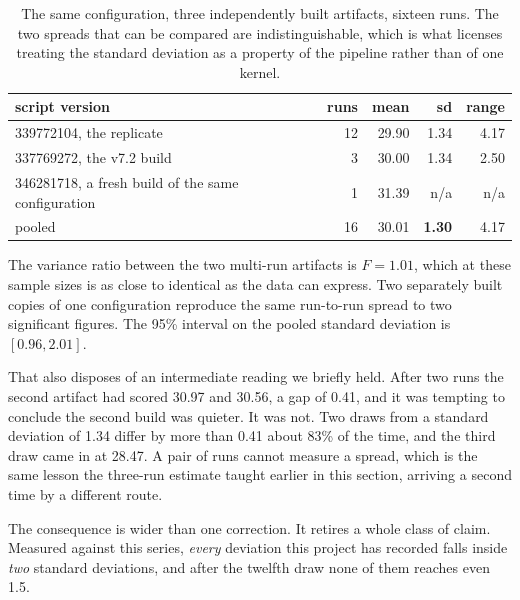 \documentclass[11pt]{article}
\begin{document}
\begin{table}[H]
\centering
\caption{The same configuration, three independently built artifacts, sixteen runs. The two spreads
that can be compared are indistinguishable, which is what licenses treating the standard deviation as
a property of the pipeline rather than of one kernel.}
\label{tab:twoartifacts}
\begin{tabular}{@{}lrrrr@{}}
\toprule
script version & runs & mean & sd & range \\
\midrule
339772104, the replicate & 12 & 29.90 & 1.34 & 4.17 \\
337769272, the v7.2 build & 3 & 30.00 & 1.34 & 2.50 \\
346281718, a fresh build of the same configuration & 1 & 31.39 & n/a & n/a \\
\midrule
pooled & 16 & 30.01 & \textbf{1.30} & 4.17 \\
\bottomrule
\end{tabular}
\end{table}

The variance ratio between the two multi-run artifacts is $F = 1.01$, which at these sample sizes is as close
to identical as the data can express. Two separately built copies of one configuration reproduce the
same run-to-run spread to two significant figures. The 95\% interval on the pooled standard
deviation is $[0.96, 2.01]$.

That also disposes of an intermediate reading we briefly held. After two runs the second artifact had
scored 30.97 and 30.56, a gap of 0.41, and it was tempting to conclude the second build was quieter.
It was not. Two draws from a standard deviation of 1.34 differ by more than 0.41 about 83\% of the
time, and the third draw came in at 28.47. A pair of runs cannot measure a spread, which is the same
lesson the three-run estimate taught earlier in this section, arriving a second time by a different
route.

The consequence is wider than one correction. It retires a whole class of claim.
Measured against this series, \emph{every} deviation this project has recorded falls inside
\emph{two} standard deviations, and after the twelfth draw none of them reaches even 1.5.
\end{document}
